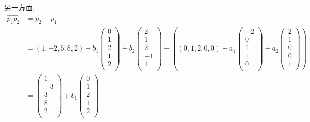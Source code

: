 \documentclass[color=black,device=normal,lang=cn,mode=geye]{elegantnote}
\begin{document}
\begin{solution}
    另一方面,
    \begin{align*}
        \overrightarrow{p_1p_2} & =\dot{p}_2-\dot{p}_1 \\
        & =(1,-2,5,8,2)+b_1\begin{pmatrix}
            0 \\
            1 \\
            2 \\
            1 \\
            2 \\
        \end{pmatrix}+b_2\begin{pmatrix}
            2 \\
            1 \\
            2 \\
            -1 \\
            1 \\
        \end{pmatrix}-((0,1,2,0,0)+a_1\begin{pmatrix}
            -2 \\
            0 \\
            1 \\
            1 \\
            0 \\
        \end{pmatrix}+a_2\begin{pmatrix}
            2 \\
            1 \\
            0 \\
            0 \\
            1 \\
        \end{pmatrix}) \\
        & =\begin{pmatrix}
            1 \\
            -3 \\
            3 \\
            8 \\
            2 \\
        \end{pmatrix}+b_1\begin{pmatrix}
            0 \\
            1 \\
            2 \\
            1 \\
            2 \\

\end{pmatrix}
\end{align*}
\end{solution}
\end{document}
